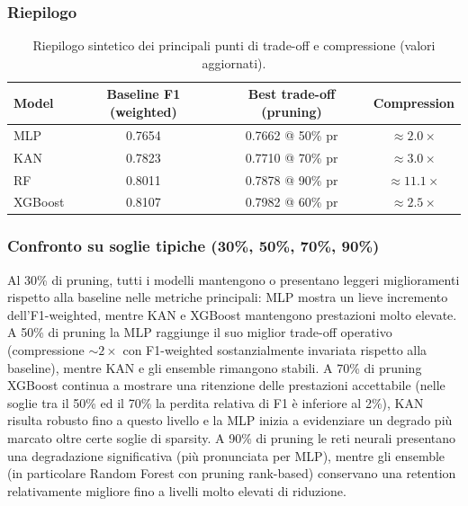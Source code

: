 \documentclass[a4paper,12pt]{report}
\begin{document}
	\subsubsection{Riepilogo}
	\begin{table}[H]
		\centering
		\setlength{\tabcolsep}{2pt}
		\begin{tabular}{lccc}
			\toprule
			\textbf{Model} & \textbf{Baseline F1 (weighted)} & \textbf{Best trade-off (pruning)} & \textbf{Compression} \\
			\midrule
			MLP      & 0.7654 & 0.7662 @ 50\% pr & $\approx 2.0\times$ \\
			KAN      & 0.7823 & 0.7710 @ 70\% pr & $\approx 3.0\times$ \\
			RF       & 0.8011 & 0.7878 @ 90\% pr & $\approx 11.1\times$ \\
			XGBoost  & 0.8107 & 0.7982 @ 60\% pr & $\approx 2.5\times$ \\
			\bottomrule
		\end{tabular}
		\caption{Riepilogo sintetico dei principali punti di trade-off e compressione (valori aggiornati).}
	\end{table}
	
	\subsubsection{Confronto su soglie tipiche (30\%, 50\%, 70\%, 90\%)}
	Al 30\% di pruning, tutti i modelli mantengono o presentano leggeri miglioramenti rispetto alla baseline nelle metriche principali: MLP mostra un lieve incremento dell'F1-weighted, mentre KAN e XGBoost mantengono prestazioni molto elevate. A 50\% di pruning la MLP raggiunge il suo miglior trade-off operativo (compressione $\sim 2\times$ con F1-weighted sostanzialmente invariata rispetto alla baseline), mentre KAN e gli ensemble rimangono stabili. A 70\% di pruning XGBoost continua a mostrare una ritenzione delle prestazioni accettabile (nelle soglie tra il 50\% ed il 70\% la perdita relativa di F1 è inferiore al 2\%), KAN risulta robusto fino a questo livello e la MLP inizia a evidenziare un degrado più marcato oltre certe soglie di sparsity. A 90\% di pruning le reti neurali presentano una degradazione significativa (più pronunciata per MLP), mentre gli ensemble (in particolare Random Forest con pruning rank-based) conservano una retention relativamente migliore fino a livelli molto elevati di riduzione.
	
\end{document}
